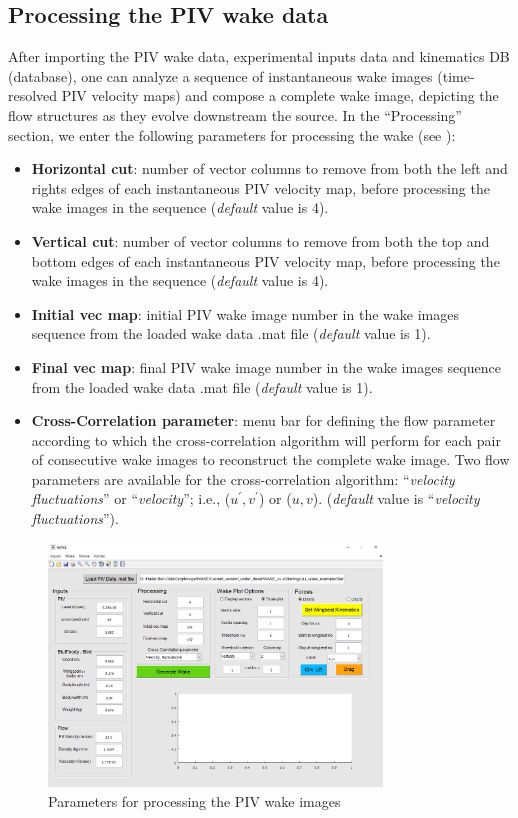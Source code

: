 \documentclass[12pt,a4paper]{article}
\begin{document}
\subsection{Processing the PIV wake data}
After importing the PIV wake data, experimental inputs data and kinematics DB (database), one can analyze a sequence of instantaneous wake images (time-resolved PIV velocity maps) and compose a complete wake image, depicting the flow structures as they evolve downstream the source.
In the ``Processing'' section, we enter the following parameters for processing the wake (see ):
\begin{itemize}
	\item \textbf{Horizontal cut}: number of vector columns to remove from both the left and rights edges of each instantaneous PIV velocity map, before processing the wake images in the sequence (\textit{default} value is 4).
	\item \textbf{Vertical cut}: number of vector columns to remove from both the top and bottom edges of each instantaneous PIV velocity map, before processing the wake images in the sequence (\textit{default} value is 4).
	\item \textbf{Initial vec map}: initial PIV wake image number in the wake images sequence from the loaded wake data .mat file (\textit{default} value is 1).
	\item \textbf{Final vec map}: final PIV wake image number in the wake images sequence from the loaded wake data .mat file (\textit{default} value is 1).
	\item \textbf{Cross-Correlation parameter}: menu bar for defining the flow parameter according to which the cross-correlation algorithm will perform for each pair of consecutive wake images to reconstruct the complete wake image. Two flow parameters are available for the cross-correlation algorithm:  ``\textit{velocity fluctuations}'' or ``\textit{velocity}''; i.e., ($u^\prime, v^\prime$) or ($u,v$). (\textit{default} value is ``\textit{velocity fluctuations}'').
\end{itemize}
  
\begin{figure}[ht!]
 	\centering
 	\includegraphics[width=0.79\textwidth]{Wake-processing-parameters}
 	\caption{Parameters for processing the PIV wake images}
 	\label{fig:GUI-Wake-processing-parameters}
\end{figure}
\end{document}
